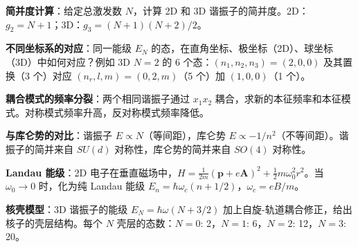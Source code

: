 \begin{drillbox}[训练点与考法变体]
 \textbf{简并度计算}：给定总激发数 $N$，计算 2D 和 3D 谐振子的简并度。2D：$g_2=N+1$；3D：$g_3=(N+1)(N+2)/2$。

 \textbf{不同坐标系的对应}：同一能级 $E_N$ 的态，在直角坐标、极坐标（2D）、球坐标（3D）中如何对应？例如 3D $N=2$ 的 6 个态：$(n_1,n_2,n_3)=(2,0,0)$ 及其置换（3 个）对应 $(n_r,l,m)=(0,2,m)$（5 个）加 $(1,0,0)$（1 个）。

 \textbf{耦合模式的频率分裂}：两个相同谐振子通过 $x_1x_2$ 耦合，求新的本征频率和本征模式。对称模式频率升高，反对称模式频率降低。

 \textbf{与库仑势的对比}：谐振子 $E\propto N$（等间距），库仑势 $E\propto-1/n^2$（不等间距）。谐振子的简并来自 $SU(d)$ 对称性，库仑势的简并来自 $SO(4)$ 对称性。

 \textbf{Landau 能级}：2D 电子在垂直磁场中，$H=\frac{1}{2m}(\mathbf{p}+e\mathbf{A})^2+\frac12m\omega_0^2r^2$。当 $\omega_0\to0$ 时，化为纯 Landau 能级 $E_n=\hbar\omega_c(n+1/2)$，$\omega_c=eB/m$。

 \textbf{核壳模型}：3D 谐振子的能级 $E_N=\hbar\omega(N+3/2)$ 加上自旋-轨道耦合修正，给出核子的壳层结构。每个 $N$ 壳层的态数：$N=0$: 2，$N=1$: 6，$N=2$: 12，$N=3$: 20。
\end{drillbox}

